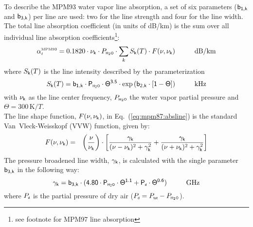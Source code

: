 {
\label{levele:h2o_mpm93_lines}
To describe the MPM93 water vapor line absorption, a set of six parameters 
($\sf b_{\sf 1,k}$ and $\sf b_{\sf 3,k}$) per line are used: two for the line strength and 
four for the line width. The total line absorption coefficient 
(in units of dB/km) is the sum over all individual line absorption 
coefficients\footnote{see footnote for MPM97 line absorption}:
\begin{equation}
  \label{eq:mpm93:absline}
  \alphampmnl = 0.1820 \cdot \nuk \cdot \phzo \cdot 
  \sum_{k}{\inten \cdot \shape}\hspace*{10mm}\mbox{dB/km}
\end{equation}
where $S_{\sf k}(T)$ is the line intensity described by the parameterization
\begin{equation}
  \label{eq:mpm93:strength}
  \inten = \bek \cdot \phzo \cdot \Theta^{3.5} 
           \cdot \exp{(\bzk \cdot [1-\Theta])}\hspace*{10mm}\mbox{kHz}
\end{equation}
with $\nu_{\sf k}$ as the line center frequency, $P_{\mbox{\tiny \sf H}_{2}\mbox{\tiny \sf O}}$ the water
vapor partial pressure and $\Theta = 300\,\mbox{K}/T$.\\
The line shape function, $F(\nu,\nu_{\sf k})$, in Eq.~(\ref{eq:mpm87:absline}) 
is the standard Van~Vleck-Weisskopf (VVW) function, given by:
\begin{eqnarray}
  \label{eq:mpm93:VVW}
  F(\nu,\nu_{\sf k}) & = & \left(\frac{\nu}{\nu_{\sf k}}\right) \cdot 
               \left[\frac{\gamma_{\sf k}}{(\nu - \nu_{\sf k})^2 + \gamma_{\sf k}^2} + 
                     \frac{\gamma_{\sf k}}{(\nu + \nu_{\sf k})^2 + \gamma_{\sf k}^2}\right]\\
\end{eqnarray}
The pressure broadened line width, $\gamma_{\sf k}$, is calculated with the 
single parameter $\sf b_{\sf 3,k}$ in the following way:
\begin{equation}
  \label{eq:mpm93:gamma}
  \gamk = \bdk \cdot 
          (4.80 \cdot \phzo \cdot \Theta^{1.1} + \pda \cdot
          \Theta^{0.6})\hspace*{10mm}\mbox{GHz}
\end{equation}
where $P_{\mbox{\tiny \sf d}}$ is the partial pressure of dry air ($P_{\mbox{\tiny \sf d}}=P_{\mbox{\tiny \sf tot}}-P_{\mbox{\tiny \sf H}_{2}\mbox{\tiny \sf O}}$). 

}

